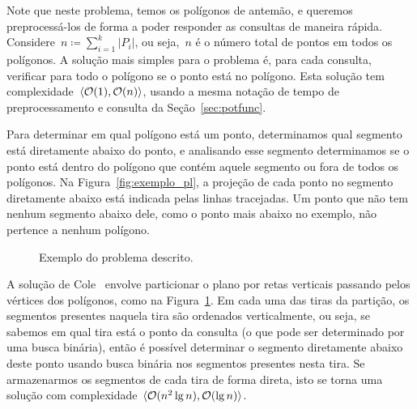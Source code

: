 \documentclass[main.tex]{subfiles}
\begin{document}
Note que neste problema, temos os polígonos de antemão, e queremos preprocessá-los de forma a poder responder as consultas de maneira rápida. Considere~${n \coloneqq \sum\limits_{i = 1}^k{|P_i|}}$, ou seja,~$n$ é o número total de pontos em todos os polígonos. A solução mais simples para o problema é, para cada consulta, verificar para todo o polígono se o ponto está no polígono. Esta solução tem complexidade~$\langle\mathcal{O}(1), \mathcal{O}(n)\rangle$, usando a mesma notação de tempo de preprocessamento e consulta da Seção~\ref{sec:potfunc}.

Para determinar em qual polígono está um ponto, determinamos qual segmento está diretamente abaixo do ponto, e analisando esse segmento determinamos se o ponto está dentro do polígono que contém aquele segmento ou fora de todos os polígonos. Na Figura~\ref{fig:exemplo_pl}, a projeção de cada ponto no segmento diretamente abaixo está indicada pelas linhas tracejadas. Um ponto que não tem nenhum segmento abaixo dele, como o ponto mais abaixo no exemplo, não pertence a nenhum polígono.

\begin{figure}
\centering
{}
\caption{Exemplo do problema descrito.} \label{fig:slabs}
\end{figure}

A solução de Cole~\cite{Cole86} envolve particionar o plano por retas verticais passando pelos vértices dos polígonos, como na Figura~\ref{fig:slabs}. Em cada uma das tiras da partição, os segmentos presentes naquela tira são ordenados verticalmente, ou seja, se sabemos em qual tira está o ponto da consulta (o que pode ser determinado por uma busca binária), então é possível determinar o segmento diretamente abaixo deste ponto usando busca binária nos segmentos presentes nesta tira.
Se armazenarmos os segmentos de cada tira de forma direta, isto se torna uma solução com complexidade~$\langle\mathcal{O}(n^2 \lg n), \mathcal{O}(\lg n)\rangle$.
\end{document}
